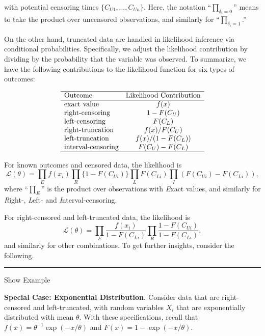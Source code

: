 \documentclass[]{book}
\theoremstyle{definition}
\theoremstyle{definition}
\theoremstyle{definition}
\theoremstyle{remark}
\begin{document}
with potential censoring times \(\{ C_{U1}, \ldots,C_{Un} \}\). Here,
the notation ``\(\prod_{\delta_i=0}\)'' means to take the product over
uncensored observations, and similarly for ``\(\prod_{\delta_i=1}\).''

On the other hand, truncated data are handled in likelihood inference
via conditional probabilities. Specifically, we adjust the likelihood
contribution by dividing by the probability that the variable was
observed. To summarize, we have the following contributions to the
likelihood function for six types of outcomes:

\[\begin{array}{lc}
\hline
\text{Outcome} & \text{Likelihood Contribution} \\
\hline 
\text{exact value} & f(x) \\
\text{right-censoring} & 1-F(C_U) \\
\text{left-censoring} & F(C_L) \\
\text{right-truncation} & f(x)/F(C_U) \\
\text{left-truncation} & f(x)/(1-F(C_L)) \\
\text{interval-censoring} & F(C_U)-F(C_L) \\
\hline
\end{array}\]

For known outcomes and censored data, the likelihood is
\[\mathcal{L}(\theta) = \prod_{E} f(x_i) \prod_{R} \{1-F(C_{Ui})\} \prod_{L}
F(C_{Li}) \prod_{I} (F(C_{Ui})-F(C_{Li})),\] where ``\(\prod_{E}\)'' is
the product over observations with \emph{E}xact values, and similarly
for \emph{R}ight-, \emph{L}eft- and \emph{I}nterval-censoring.

For right-censored and left-truncated data, the likelihood is
\[\mathcal{L}(\theta) = \prod_{E} \frac{f(x_i)}{1-F(C_{Li})} \prod_{R} \frac{1-F(C_{Ui})}{1-F(C_{Li})},\]
and similarly for other combinations. To get further insights, consider
the following.

\begin{center}\rule{0.5\linewidth}{\linethickness}\end{center}

Show Example

\hypertarget{toggleExampleEXP}{}
\textbf{Special Case: Exponential Distribution.} Consider data that are
right-censored and left-truncated, with random variables \(X_i\) that
are exponentially distributed with mean \(\theta\). With these
specifications, recall that \(f(x) = \theta^{-1} \exp(-x/\theta)\) and
\(F(x) = 1-\exp(-x/\theta)\).
\end{document}
